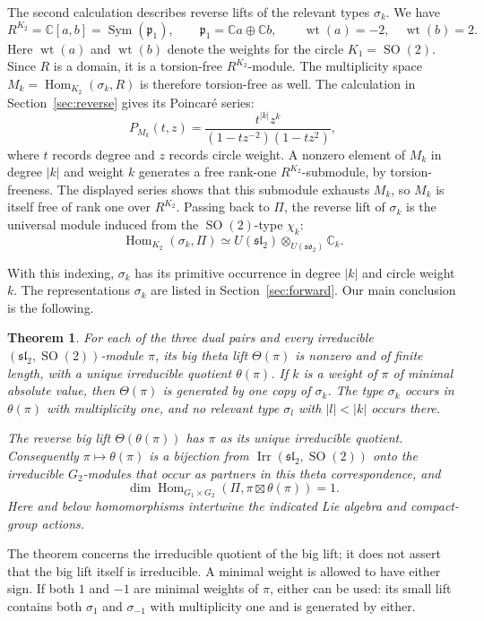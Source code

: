 \documentclass[11pt]{article}
\newcommand{\C}{\mathbb C}
\newcommand{\Sym}{\operatorname{Sym}}
\newcommand{\Hom}{\operatorname{Hom}}
\newcommand{\wt}{\operatorname{wt}}
\newcommand{\Irr}{\operatorname{Irr}}
\newcommand{\SO}{\operatorname{SO}}
\newcommand{\fp}{\mathfrak p}
\newtheorem{theorem}{Theorem}[section]
\theoremstyle{definition}
\numberwithin{equation}{section}
\begin{document}
The second calculation describes reverse lifts of the relevant types
$\sigma_k$. We have
\[
 R^{K_2}=\C[a,b]=\Sym(\fp_1),\qquad
 \fp_1=\C a\oplus\C b,\qquad \wt(a)=-2,\quad\wt(b)=2.
\]
Here $\wt(a)$ and $\wt(b)$ denote the weights for the circle
$K_1=\SO(2)$. Since $R$ is a domain, it is a torsion-free
$R^{K_2}$-module.
The multiplicity space $M_k=\Hom_{K_2}(\sigma_k,R)$ is therefore
torsion-free as well. The calculation in Section~\ref{sec:reverse} gives
its Poincar\'e series:
\[
 P_{M_k}(t,z)
   =\frac{t^{|k|}z^k}{(1-tz^{-2})(1-tz^2)},
\]
where $t$ records degree and $z$ records circle weight. A nonzero element
of $M_k$ in degree $|k|$ and weight $k$ generates a free rank-one
$R^{K_2}$-submodule, by torsion-freeness. The displayed series shows
that this submodule exhausts $M_k$, so $M_k$ is itself free of rank one
over $R^{K_2}$.
Passing back to $\Pi$, the reverse lift of $\sigma_k$ is the universal
module induced from the $\SO(2)$-type $\chi_k$:
\[
 \Hom_{K_2}(\sigma_k,\Pi)\simeq
 U(\mathfrak{sl}_2)\otimes_{U(\mathfrak{so}_2)}\C_k.
\]

With this indexing, $\sigma_k$ has its primitive occurrence in degree
$|k|$ and circle weight $k$. The representations $\sigma_k$ are listed in
Section~\ref{sec:forward}. Our main conclusion is the following.

\begin{theorem}\label{thm:main}
For each of the three dual pairs and every irreducible
$(\mathfrak{sl}_2,\SO(2))$-module $\pi$, its big theta lift $\Theta(\pi)$
is nonzero and of finite length, with a unique irreducible quotient
$\theta(\pi)$. If $k$ is a weight of $\pi$ of minimal absolute value,
then $\Theta(\pi)$ is generated by one copy of $\sigma_k$. The type
$\sigma_k$ occurs in $\theta(\pi)$ with multiplicity one, and no relevant
type $\sigma_l$ with $|l|<|k|$ occurs there.

The reverse big lift $\Theta(\theta(\pi))$ has $\pi$ as its unique
irreducible quotient. Consequently $\pi\mapsto\theta(\pi)$ is a
bijection from $\Irr(\mathfrak{sl}_2,\SO(2))$ onto the irreducible
$G_2$-modules that occur as partners in this theta correspondence, and
\[
 \dim\Hom_{G_1\times G_2}(\Pi,\pi\boxtimes\theta(\pi))=1.
\]
Here and below homomorphisms intertwine the indicated Lie algebra
and compact-group actions.
\end{theorem}

The theorem concerns the irreducible quotient of the big lift; it does
not assert that the big lift itself is irreducible. A minimal weight is
allowed to have either sign. If both $1$ and $-1$ are minimal weights of
$\pi$, either can be used: its small lift contains both $\sigma_1$ and
$\sigma_{-1}$ with multiplicity one and is generated by either.
\end{document}
